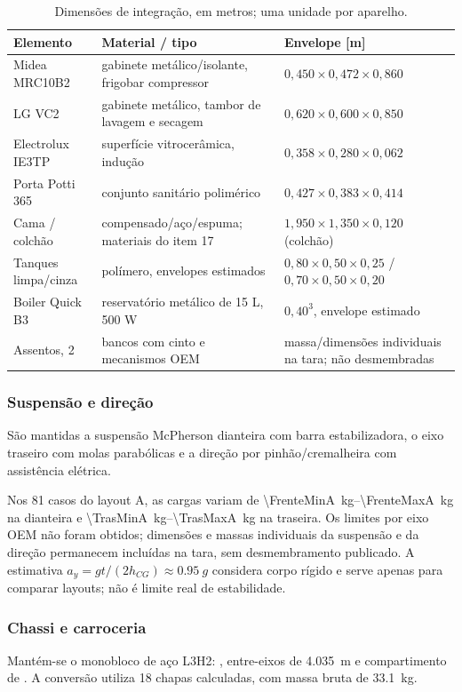 \documentclass[12pt,a4paper]{article}
\newcommand{\designsec}[1]{\FloatBarrier\Needspace{5\baselineskip}\subsubsection{#1}}
\newcommand{\itemmark}[1]{\label{item:#1}}
\begin{document}
\begin{table}[htbp]\centering\small
\caption{Dimensões de integração, em metros; uma unidade por aparelho.}
\begin{tabularx}{\linewidth}{lXp{5cm}}
\toprule Elemento & Material / tipo & Envelope [m] \\\midrule
Midea MRC10B2 & gabinete metálico/isolante, frigobar compressor & $0{,}450\times0{,}472\times0{,}860$ \\
LG VC2 & gabinete metálico, tambor de lavagem e secagem & $0{,}620\times0{,}600\times0{,}850$ \\
Electrolux IE3TP & superfície vitrocerâmica, indução & $0{,}358\times0{,}280\times0{,}062$ \\
Porta Potti 365 & conjunto sanitário polimérico & $0{,}427\times0{,}383\times0{,}414$ \\
Cama / colchão & compensado/aço/espuma; materiais do item 17 & $1{,}950\times1{,}350\times0{,}120$ (colchão) \\
Tanques limpa/cinza & polímero, envelopes estimados & $0{,}80\times0{,}50\times0{,}25$ / $0{,}70\times0{,}50\times0{,}20$ \\
Boiler Quick B3 & reservatório metálico de 15 L, 500 W & $0{,}40^3$, envelope estimado \\
Assentos, 2 & bancos com cinto e mecanismos OEM & massa/dimensões individuais na tara; não desmembradas \\
\bottomrule\end{tabularx}\end{table}

\designsec{Suspensão e direção}
\itemmark{14}
São mantidas a suspensão McPherson dianteira com barra estabilizadora, o eixo traseiro
com molas parabólicas e a direção por pinhão/cremalheira com assistência elétrica.

Nos 81 casos do layout A, as cargas variam de \SIrange{\FrenteMinA}{\FrenteMaxA}{kg}
na dianteira e \SIrange{\TrasMinA}{\TrasMaxA}{kg} na traseira. Os limites por eixo OEM não foram obtidos; dimensões e massas individuais da suspensão
e da direção permanecem incluídas na tara, sem desmembramento publicado. A estimativa $a_y=gt/(2h_{CG})\approx\SI{0,95}{g}$ considera corpo
rígido e serve apenas para comparar layouts; não é limite real de estabilidade.

\designsec{Chassi e carroceria}
\itemmark{15}
Mantém-se o monobloco de aço L3H2: ,
entre-eixos de \SI{4,035}{m} e compartimento de 
\cite{fiatsk}. A conversão utiliza 18 chapas calculadas, com massa bruta de \SI{33,1}{kg}.
\end{document}
